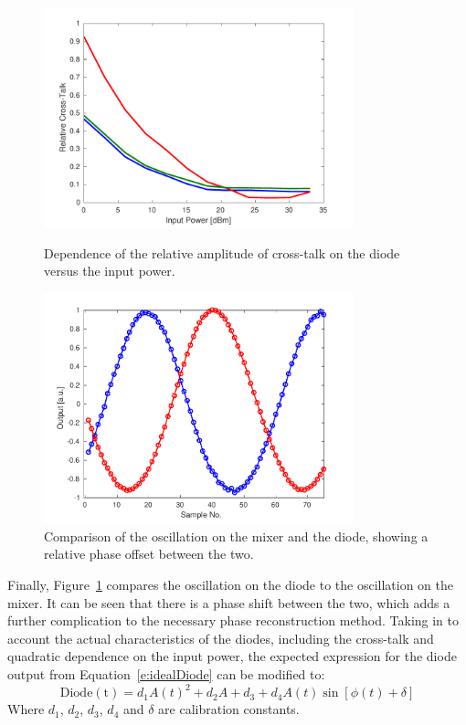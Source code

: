 \begin{figure}
  \centering
  \includegraphics[width=0.8\textwidth]{Figures/phaseMons/RelativeDiodeXTalkVsPower}
  \caption{Dependence of the relative amplitude of cross-talk on the diode versus the input power.}
  \label{f:RelativeDiodeXTalkVsPower}
  \includegraphics[width=0.8\textwidth]{Figures/phaseMons/PhaseDiodeVsMixer}
  \caption{Comparison of the oscillation on the mixer and the diode, showing a relative phase offset between the two.}
  \label{f:PhaseDiodeVsMixer}
\end{figure}

Finally, Figure~\ref{f:PhaseDiodeVsMixer} compares the oscillation on the diode to the oscillation on the mixer. It can be seen that there is a phase shift between the two, which adds a further complication to the necessary phase reconstruction method. Taking in to account the actual characteristics of the diodes, including the cross-talk and quadratic dependence on the input power, the expected expression for the diode output from Equation~\ref{e:idealDiode} can be modified to:
\begin{equation}
\mathrm{Diode(t)} = d_1A(t)^2 + d_2A + d_3 + d_4A(t)\sin[\phi(t)+\delta]
\label{e:actualDiodeResponse}
\end{equation}
Where \(d_1\), \(d_2\), \(d_3\), \(d_4\) and \(\delta\) are calibration constants.



